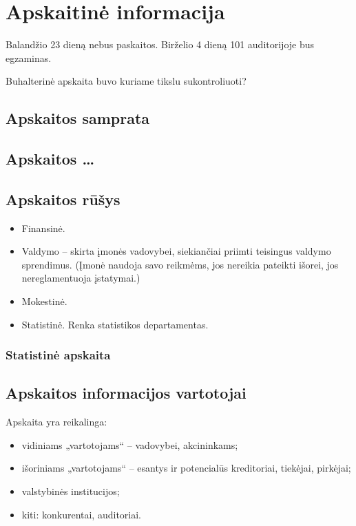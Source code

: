 \chapter{Apskaitinė informacija}

\begin{note}
  Balandžio 23 dieną nebus paskaitos.
  Birželio 4 dieną 101 auditorijoje bus egzaminas.
\end{note}

Buhalterinė apskaita buvo kuriame tikslu sukontroliuoti?

\section{Apskaitos samprata}

\section{Apskaitos …}

\section{Apskaitos rūšys}

\begin{itemize}
  \item Finansinė.
  \item Valdymo – skirta įmonės vadovybei, siekiančiai priimti teisingus
    valdymo sprendimus. (Įmonė naudoja savo reikmėms, jos nereikia
    pateikti išorei, jos nereglamentuoja įstatymai.)
  \item Mokestinė.
  \item Statistinė. Renka statistikos departamentas.
\end{itemize}

\subsection{Statistinė apskaita}

\section{Apskaitos informacijos vartotojai}

Apskaita yra reikalinga:
\begin{itemize}
  \item vidiniams „vartotojams“ – vadovybei, akcininkams;
  \item išoriniams „vartotojams“ – esantys ir potencialūs kreditoriai,
    tiekėjai, pirkėjai;
  \item valstybinės institucijos;
  \item kiti: konkurentai, auditoriai.
\end{itemize}

